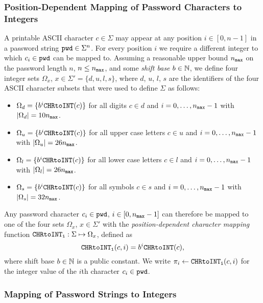 \subsubsection{Position-Dependent Mapping of Password Characters to Integers}
A printable \ac{ASCII}  character $c\in\Sigma$ may appear at any position $i\in[0, n-1]$ in a password string $\mathtt{pwd}\in\Sigma^n$. For every position $i$ we require a different integer to which $c_i\in\mathtt{pwd}$ can be mapped to.
Assuming a reasonable upper bound ${n_\mathtt{max}}$ on the password length $n$, \ie $n\leq {n_\mathtt{max}}$, and some \emph{shift base} $b\in\mathbb{N}$, we define four integer sets $\Omega_x$, $x\in\Sigma' = \{d, u, l, s\}$, where $d$, $u$, $l$, $s$ are the identifiers of the four \ac{ASCII}  character subsets that were used to define $\Sigma$ as follows:
\begin{itemize}
	\item $\Omega_d = \{b^i\texttt{CHRtoINT}(c)\}$ for all digits $c\in d$ and $i=0,\ldots,{n_\mathtt{max}}-1$ with $|\Omega_d|= 10{n_\mathtt{max}}$.
	\item $\Omega_u = \{b^i\texttt{CHRtoINT}(c)\}$ for all upper case letters $c\in u$ and $i=0,\ldots,{n_\mathtt{max}}-1$ with $|\Omega_u|= 26{n_\mathtt{max}}$.
	\item $\Omega_l = \{b^i\texttt{CHRtoINT}(c)\}$ for all lower case letters $c\in l$ and $i=0,\ldots,{n_\mathtt{max}}-1$ with $|\Omega_l|= 26{n_\mathtt{max}}$.
	\item $\Omega_s = \{b^i\texttt{CHRtoINT}(c)\}$ for all symbols $c\in s$ and $i=0,\ldots,{n_\mathtt{max}}-1$ with $|\Omega_s|= 32{n_\mathtt{max}}$.
\end{itemize}
Any password character $c_i\in\mathtt{pwd}$, $i\in[0,{n_\mathtt{max}}-1]$ can therefore be mapped to one of the four sets $\Omega_x$, $x\in\Sigma'$ with the \emph{position-dependent character mapping} function $\texttt{CHRtoINT}_\texttt{i}:\Sigma\mapsto\Omega_{x}$, defined as
\[
\texttt{CHRtoINT}_\texttt{i}(c, i)= b^i\texttt{CHRtoINT}(c),
\]
where shift base $b\in\mathbb{N}$ is a public constant.
We write $\pi_i \gets \texttt{CHRtoINT}_\texttt{i}(c, i)$ for the integer value of the $i$th character $c_i\in\mathtt{pwd}$.

\subsubsection{Mapping of Password Strings to Integers}


